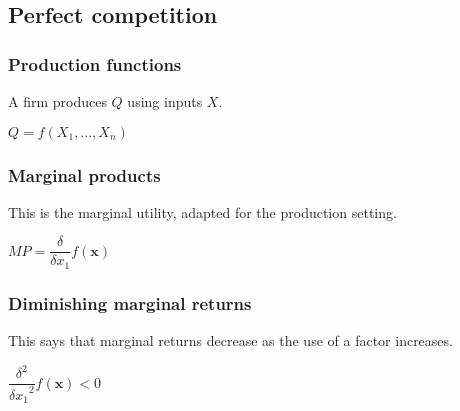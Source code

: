 
\subsection{Perfect competition}

\subsubsection{Production functions}

A firm produces \(Q\) using inputs \(X\).

\(Q=f(X_1,...,X_n)\)

\subsubsection{Marginal products}

This is the marginal utility, adapted for the production setting.

\(MP=\dfrac{\delta }{\delta x_1}f(\mathbf x)\)

\subsubsection{Diminishing marginal returns}

This says that marginal returns decrease as the use of a factor increases.

\(\dfrac{\delta^2 }{{\delta x_1}^2}f(\mathbf x)<0\)

